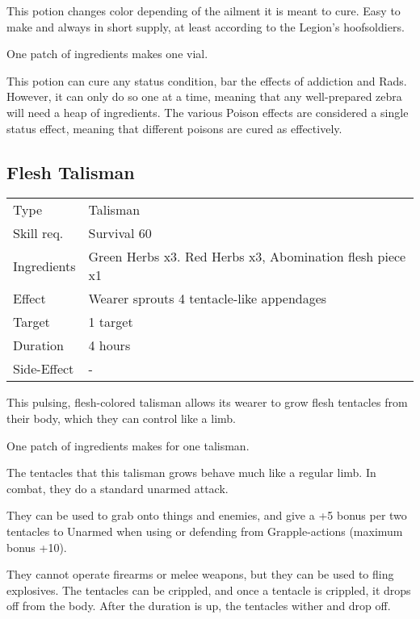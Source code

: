 \documentclass[11pt,a4paper,twocolumn]{book}
\begin{document}
\medskip

This potion changes color depending of the ailment it is meant to cure. Easy to make and always in short supply, at least according to the Legion's hoofsoldiers.

One patch of ingredients makes one vial.

This potion can cure any status condition, bar the effects of addiction and Rads. However, it can only do so one at a time, meaning that any well-prepared zebra will need a heap of ingredients.
The various Poison effects are considered a single status effect, meaning that different poisons are cured as effectively.

\vfill

\subsection*{Flesh Talisman}
{
	\begin{tabu} to 75mm{| X[l,4] | X[l,8] |}
		\hline
		Type 			& Talisman													\\
		Skill req.	    & Survival 60 												\\
		Ingredients     & Green Herbs x3. Red Herbs x3, Abomination flesh piece x1	\\
		Effect     		& Wearer sprouts 4 tentacle-like appendages					\\
		Target      	& 1 target													\\
		Duration  		& 4 hours	 												\\
		Side-Effect     & -															\\ \hline
	\end{tabu}
	
}

\medskip

This pulsing, flesh-colored talisman allows its wearer to grow flesh tentacles from their body, which they can control like a limb.

One patch of ingredients makes for one talisman.

The tentacles that this talisman grows behave much like a regular limb. In combat, they do a standard unarmed attack.

They can be used to grab onto things and enemies, and give a +5 bonus per two tentacles to Unarmed when using or defending from Grapple-actions (maximum bonus +10).

They cannot operate firearms or melee weapons, but they can be used to fling explosives. The tentacles can be crippled, and once a tentacle is crippled, it drops off from the body. After the duration is up, the tentacles wither and drop off.
\end{document}

